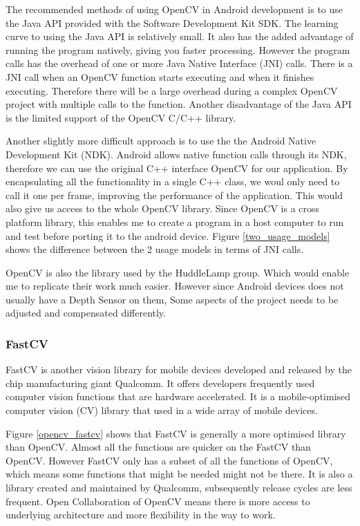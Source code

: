 The recommended methods of using OpenCV in Android development is to use the Java API provided with the Software Development Kit SDK\cite{opencv_usage_model}. The learning curve to using the Java API is relatively small. It also has the added advantage of running the program natively, giving you faster processing. However the program calls has the overhead of  one or more Java Native Interface (JNI) calls. There is a JNI call when an OpenCV function starts executing and when it finishes executing. Therefore there will be a large overhead during a complex OpenCV project with multiple calls to the function. Another disadvantage of the Java API is the limited support of the OpenCV C/C++ library.

Another slightly more difficult approach is to use the the Android Native Development Kit (NDK). Android allows native function calls through its NDK, therefore we can use the original C++ interface OpenCV for our application. By encapsulating all the functionality in a single C++ class, we woul only need to call it one per frame, improving the performance of the application. This would also give us access to the whole OpenCV library. Since OpenCV is a cross platform library, this enables me to create a program in a host computer to run and test before porting it to the android device. Figure \ref{two_usage_models} shows the difference between the 2 usage models in terms of JNI calls. 

OpenCV is also the library used by the HuddleLamp group. Which would enable me to replicate their work much easier. However since Android devices does not usually have a Depth Sensor on them, Some aspects of the project needs to be adjusted and compensated differently.

\subsubsection{FastCV}
FastCV is another vision library for mobile devices developed and released by the chip manufacturing giant Qualcomm\cite{fastcv}. It offers developers frequently used computer vision functions that are hardware accelerated. It is a mobile-optimised computer vision (CV) library that used in a wide array of mobile devices.

Figure \ref{opencv_fastcv} shows that FastCV is generally a more optimised library than OpenCV. Almost all the functions are quicker on the FastCV than OpenCV. However FastCV only has a subset of all the functions of OpenCV, which means some functions that might be needed might not be there. It is also a library created and maintained by Qualcomm, subsequently release cycles are less frequent. Open Collaboration of OpenCV means there is more access to underlying architecture and more flexibility in the way to work. 

